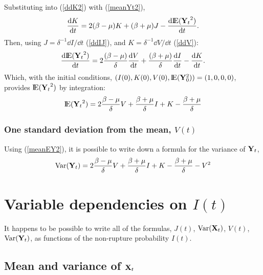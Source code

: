 Substituting into (\ref{ddK2}) with (\ref{meanYt2}), 
$$\displaystyle\frac{{\rm d} K}{{\rm d} t} =2(\beta-\mu)K+ (\beta + \mu)J- \displaystyle\frac{{\rm d} {\rm I}\!{\rm E}({{\bf Y}_t}^2)}{{\rm d} t}.$$
Then, using $J = \delta^{-1}\dd I/\dd t$ (\ref{ddIJ}), and $K = \delta^{-1} \dd V / \dd t$ (\ref{ddV}):
\begin{equation}
\displaystyle\frac{{\rm d} {\rm I}\!{\rm E}({{\bf Y}_t}^2)}{{\rm d} t} = 2\frac{(\beta-\mu)}{\delta}\displaystyle\frac{{\rm d} V}{{\rm d} t}+ \frac{(\beta + \mu)}{\delta}\displaystyle\frac{{\rm d} I}{{\rm d} t} - \displaystyle\frac{{\rm d} K}{{\rm d} t}.
\end{equation}
Which, with the initial conditions, $(I(0), K(0), V(0), {\rm I}\!{\rm E}({\bf Y}_0^2)) = (1,0,0,0)$, provides ${\rm I}\!{\rm E}({{\bf Y}_t}^2)$ by integration:
\begin{equation}
\label{meanEY2}
{\rm I}\!{\rm E}({{\bf Y}_t}^2) = 2\frac{\beta-\mu}{\delta} V + \frac{\beta+\mu}{\delta}I + K - \frac{\beta+\mu}{\delta}
\end{equation}


\subsubsection{One standard deviation from the mean, $V(t)$}

Using (\ref{meanEY2}), it is possible to write down a formula for the variance of ${{\bf Y}_t}$,
\begin{equation}
\label{VarY}
\text{Var}({{\bf Y}_t}) = 2\frac{\beta-\mu}{\delta} V + \frac{\beta+\mu}{\delta}I + K - \frac{\beta+\mu}{\delta} - V^2
\end{equation}


























\section{Variable dependencies on $I(t)$}

It happens to be possible to write all of the formulas, $J(t)$, $\text{Var}({{\bf X}_t})$, $V(t)$, $\text{Var}({{\bf Y}_t})$, as functions of the non-rupture probability $I(t)$. 


\subsection{Mean and variance of ${{\bf X}_t}$}

